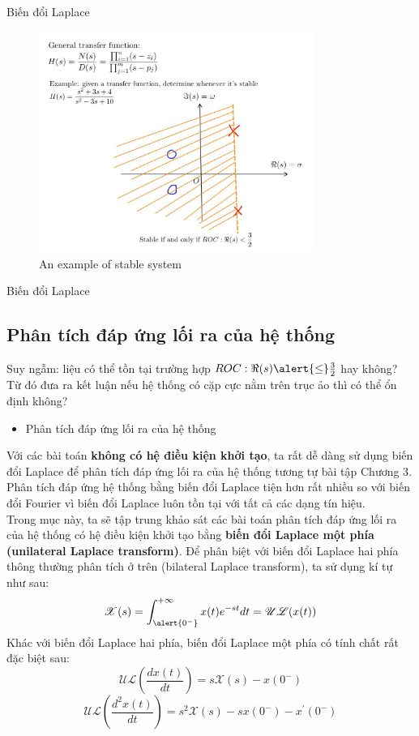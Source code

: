 \documentclass[8pt]{beamer}
\begin{document}
\begin{frame}{Biến đổi Laplace}
\begin{figure}[h]
			\includegraphics[width=0.8\textwidth]{example.jpg}
			\caption{An example of stable system}\label{fig:re5}

		\end{figure}
\end{frame}
\begin{frame}{Biến đổi Laplace}
	\subsection{Phân tích đáp ứng lối ra của hệ thống}
Suy ngẫm: liệu có thể tồn tại trường hợp  $ROC: \Re{(s)}\alert{\leq}\frac{3}{2}$ hay không? Từ đó đưa ra kết luận nếu hệ thống có cặp cực nằm trên trục ảo thì có thể ổn định không?
\begin{itemize}
	\item Phân tích đáp ứng lối ra của hệ thống
\end{itemize}
Với các bài toán \textbf{không có hệ điều kiện khởi tạo}, ta rất dễ dàng sử dụng biến đổi Laplace để phân tích đáp ứng lối ra của hệ thống tương tự bài tập \alert{Chương 3}. Phân tích đáp ứng hệ thống bằng biến đổi Laplace tiện hơn rất nhiều so với biến đổi Fourier vì biến đổi Laplace luôn tồn tại với tất cả các dạng tín hiệu. 
\\ Trong mục này, ta sẽ tập trung khảo sát các bài toán phân tích đáp ứng lối ra của hệ thống \alert{có hệ điều kiện khởi tạo} bằng \textbf{biến đổi Laplace một phía (unilateral Laplace transform)}. Để phân biệt với biến đổi Laplace hai phía thông thường phân tích ở trên (bilateral Laplace transform), ta sử dụng kí tự như sau:
$$\mathscr{X}(s)=\int_{\alert{0^-}}^{+\infty}x(t)e^{-st}dt=\mathscr{UL}(x(t))$$
Khác với biến đổi Laplace hai phía, biến đổi Laplace một phía có tính chất rất đặc biệt sau:
$$\mathscr{UL}\left(\frac{dx(t)}{dt}\right)=s\mathscr{X}(s)-x(0^-)$$
$$\mathscr{UL}\left(\frac{d^2x(t)}{dt}\right)=s^2\mathscr{X}(s)-sx(0^-)-x^{'}(0^-)$$
\end{frame}
\end{document}
